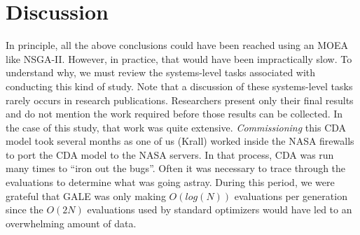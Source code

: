 \documentclass[journal]{IEEEtran}
\newcommand{\fig}[1]{Figure~\ref{fig:#1}}
\begin{document}



\section{Discussion}

In principle, all the above conclusions could have been reached using an MOEA like NSGA-II. 
However, in practice, that would have been impractically slow. 
To understand why, we must review the systems-level tasks associated with conducting this kind of study.
Note that a discussion of these systems-level tasks rarely occurs in research publications. 
Researchers present only their final results and do not mention the work required before those results can be collected. 
In the case of this study, that work was quite extensive.  
{\em Commissioning} this CDA model took several months as one of us (Krall) worked inside the NASA firewalls to port the CDA model to the NASA servers. 
In that process, CDA was run many times to ``iron out the bugs''.  
Often it was necessary to trace through the evaluations to determine what was
going astray. 
During this period, we were grateful that GALE was only making $O(log(N))$ evaluations per generation since the $O(2N)$ evaluations used by standard optimizers would have led to an overwhelming amount of data.
\end{document}
